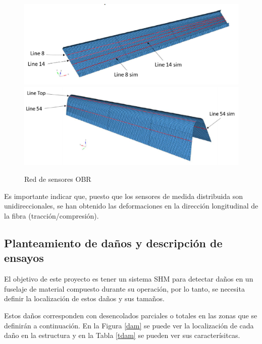 \begin{figure}[ht!]
    \centering
    \includegraphics[width=130mm]{3/Fotos/OBR_1.png}
    \includegraphics[width=130mm]{3/Fotos/OBR_2.png}
    \caption{Red de sensores OBR}
    \label{OBR_sensores}
\end{figure}

Es importante indicar que, puesto que los sensores de medida distribuida son unidireccionales, se han obtenido las deformaciones en la dirección longitudinal de la fibra (tracción/compresión).


\subsection{Planteamiento de daños y descripción de ensayos} 

El objetivo de este proyecto es tener un sistema SHM para detectar daños en un fuselaje de material compuesto durante su operación, por lo tanto, se necesita definir la localización de estos daños y sus tamaños.

Estos daños corresponden con desencolados parciales o totales en las zonas que se definirán a continuación. En la Figura \ref{dam} se puede ver la localización de cada daño en la estructura y en la Tabla \ref{tdam} se pueden ver sus caracterísitcas.

